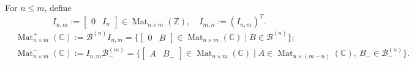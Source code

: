 \documentclass[11pt]{article}
\DeclareMathOperator{\Mat}{Mat}
\theoremstyle{definition}\newtheorem{definition}[theorem]{Definition}
\theoremstyle{definition}\newtheorem{remark}[theorem]{Remark}
\theoremstyle{remark}
\numberwithin{equation}{section}
\begin{document}
For $n \leq m$, define
\begin{equation*}
    I_{n,m} := \begin{bmatrix} 
        0 & I_n
    \end{bmatrix} \in \Mat_{n\times m}(\mathbb{Z}), \quad I_{m,n}:=(I_{n,m})^T.
\end{equation*} 
\begin{align*}
    &\Mat_{n\times m}^+(\mathbb{C}):= \mathcal{B}^{(n)}I_{n,m} = \{ \begin{bmatrix}
        0 & B
    \end{bmatrix} \in \Mat_{n\times m}(\mathbb{C}) \mid B \in \mathcal{B}^{(n)} \};\\
    &\Mat_{n\times m}^-(\mathbb{C}):= I_{n,m}\mathcal{B}^{(m)}_- = \{ \begin{bmatrix}
        A & B_-
    \end{bmatrix} \in \Mat_{n\times m}(\mathbb{C}) \mid A \in \Mat_{n\times (m-n) }(\mathbb{C}), \ B_- \in \mathcal{B}_-^{(n)}  \}.
\end{align*}
\end{document}
